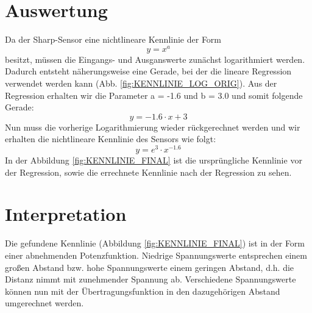 \documentclass[12pt,oneside,a4paper]{report}
\begin{document}
  
\newpage
\section{Auswertung}
\label{chap:VERSUCH_2_AUSWERTUNG}

Da der Sharp-Sensor eine nichtlineare Kennlinie der Form
\begin{equation}\label{eq:NICHT_LIN_KENN}
y=x^a
\end{equation}
 besitzt, müssen die Eingangs- und Ausganswerte zunächst logarithmiert werden. Dadurch entsteht näherungsweise eine Gerade, bei der die lineare Regression verwendet werden kann (Abb.  \ref{fig:KENNLINIE_LOG_ORIG}).
Aus der Regression erhalten wir die Parameter a = -1.6 und b = 3.0 und somit folgende Gerade:
\begin{equation}\label{eq:NICHT_LIN_KENN}
y= -1.6 \cdot x + 3
\end{equation}
Nun muss die vorherige Logarithmierung wieder rückgerechnet werden und wir erhalten die nichtlineare Kennlinie des Sensors wie folgt:
\begin{equation}
y= e^3 \cdot x^{-1.6}
\end{equation}
In der Abbildung \ref{fig:KENNLINIE_FINAL} ist die ursprüngliche Kennlinie vor der Regression, sowie die errechnete Kennlinie nach der Regression zu sehen.
\paragraph{}


\section{Interpretation}
\label{chap:VERSUCH_2_INTERPRETATION}

Die gefundene Kennlinie (Abbildung \ref{fig:KENNLINIE_FINAL}) ist in der Form einer abnehmenden Potenzfunktion. Niedrige Spannungswerte entsprechen einem großen Abstand bzw. hohe Spannungswerte einem geringen Abstand, d.h. die Distanz nimmt mit zunehmender Spannung ab. Verschiedene Spannungswerte können nun mit der Übertragungsfunktion in den dazugehörigen Abstand umgerechnet werden.
\end{document}
